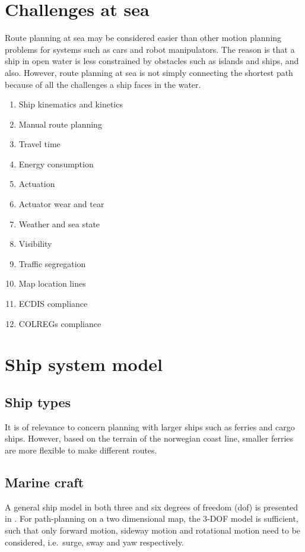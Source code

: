 \section{Challenges at sea}

Route planning at sea may be considered easier than other motion planning problems for systems such as cars and robot manipulators. The reason is that a ship in open water is less constrained by obstacles such as islands and ships, and also. However, route planning at sea is not simply connecting the shortest path because of all the challenges a ship faces in the water.

\begin{enumerate}
  \item Ship kinematics and kinetics
  \item Manual route planning
  \item Travel time
  \item Energy consumption
  \item Actuation
  \item Actuator wear and tear
  \item Weather and sea state
  \item Visibility
  \item Traffic segregation
  \item Map location lines
  \item ECDIS compliance
  \item COLREGs compliance
\end{enumerate}


\section{Ship system model}

\subsection{Ship types}

It is of relevance to concern planning with larger ships such as ferries and cargo ships. However, based on the terrain of the norwegian coast line, smaller ferries are more flexible to make different routes. 

\subsection{Marine craft}
A general ship model in both three and six degrees of freedom (\gls{dof}) is presented in \parencite{fossen2011}. For path-planning on a two dimensional map, the 3-DOF model is sufficient, such that only forward motion, sideway motion and rotational motion need to be considered, i.e.\ surge, sway and yaw respectively.



